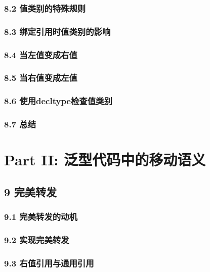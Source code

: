 \documentclass[11pt,a4paper,UTF8]{ctexart}
\begin{document}
		\subsubsection{8.2 值类别的特殊规则}
		
		\subsubsection{8.3 绑定引用时值类别的影响}
		
		\subsubsection{8.4 当左值变成右值}
		
		\subsubsection{8.5 当右值变成左值}
		
		\subsubsection{8.6 使用decltype检查值类别}
		
		\subsubsection{8.7 总结}
		
		
	\section{Part II: 泛型代码中的移动语义}
	
	\subsection{9 完美转发}
	
		\subsubsection{9.1 完美转发的动机}
		
		\subsubsection{9.2 实现完美转发}
		
		\subsubsection{9.3 右值引用与通用引用}
		
\end{document}
